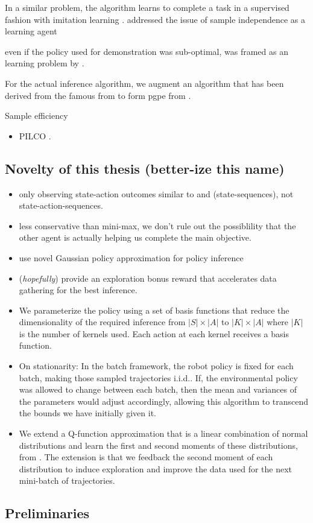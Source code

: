     In a similar problem, the \DAGGER algorithm learns to complete a task in a supervised fashion with imitation
    learning \cite{ross2011reduction}. \DAGGER addressed the issue of sample independence as a learning agent


    even if the policy used for demonstration was sub-optimal, was framed as an  learning problem by
    \cite{abbeel}.

    For the actual inference algorithm, we augment an algorithm that has been derived from the famous \reinforce from
    \cite{williams1992simple} to form \ac{pgpe} from \cite{tangkaratt2014model}.

    Sample efficiency
    \begin{itemize}
        \item PILCO \cite{deisenroth2011pilco}.
    \end{itemize}

\subsection{Novelty of this thesis (better-ize this name)}\label{sec:literature_novelty}
    \begin{itemize}
        \item only observing state-action outcomes similar to \cite{renato} and \cite{lim2013reinforcement}
            (state-sequences), not state-action-sequences.

        \item less conservative than mini-max, we don't rule out the possiblility that the other agent is actually
            helping us complete the main objective.
        \item use novel Gaussian policy approximation for policy inference
        \item (\textit{hopefully}) provide an exploration bonus reward that accelerates data gathering for the best
            inference.
        \item We parameterize the policy using a set of basis functions that reduce the dimensionality of the required
            inference from $|S|\times|A|$ to $|K|\times|A|$ where $|K|$ is the number of kernels used. Each action at
            each kernel receives a basis function.
        \item On stationarity: In the batch framework, the robot policy is fixed for each batch, making those sampled
            trajectories i.i.d.. If, the environmental policy was allowed to change between each batch, then the mean
            and variances of the parameters would adjust accordingly, allowing this algorithm to transcend the bounds we
            have initially given it.

        \item We extend a Q-function approximation that is a linear combination of normal distributions and learn the
            first and second moments of these distributions, from \cite{tangkaratt2014model}. The extension is that we
            feedback the second moment of each distribution to induce exploration and improve the data used for the next
            mini-batch of trajectories.
    \end{itemize}

\subsection{Preliminaries}\label{sec:preliminaries}
